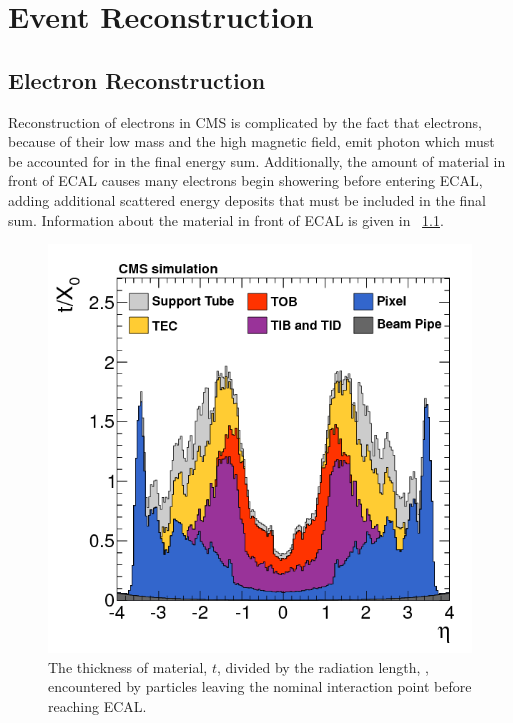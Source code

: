 \chapter{Event Reconstruction}
\label{reconstruction_chapter}

\section{Electron Reconstruction}
\label{sec:electron_reconstruction}

Reconstruction of electrons in CMS is complicated by the fact that electrons,
because of their low mass and the high magnetic field, emit photon which must
be accounted for in the final energy sum. Additionally, the amount of material
in front of ECAL causes many electrons begin showering before entering ECAL,
adding additional scattered energy deposits that must be included in the final
sum. Information about the material in front of ECAL is given in
\FIG~\ref{fig:tracker_material}\cite{cms_tracker_2014}.

\begin{figure}[!htbp]
    \centering
    \includegraphics[width=\textwidth]{figures/tracker_material_budget.png}
    \caption[
        Material thickness infront of of ECAL.
    ]{
        The thickness of material, $t$, divided by the radiation length,
        \radiationlength, encountered by particles leaving the nominal
        interaction point before reaching ECAL.
    }
    \label{fig:tracker_material}
\end{figure}

